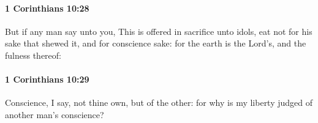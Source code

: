 		\paragraph{1 Corinthians 10:28} %
			\label{1CORINTHIANS-10-28}

			But if any man say unto you, This is offered in sacrifice unto idols, eat not for his sake that shewed it, and for conscience sake: for the earth is the Lord's, and the fulness thereof:

			\begin{framed}
				\scriptsize
				\begin{compactdesc}
					\item[SBLG] 
				\end{compactdesc}
			\end{framed}

		\paragraph{1 Corinthians 10:29} %
			\label{1CORINTHIANS-10-29}

			Conscience, I say, not thine own, but of the other: for why is my liberty judged of another man's conscience?

